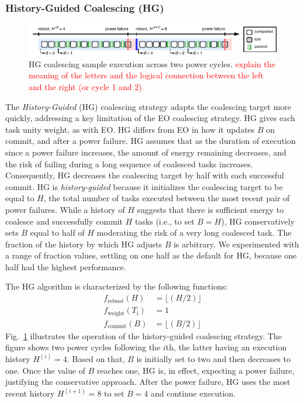 \subsubsection{History-Guided Coalescing (HG)}
\label{subsec:energyAware}
%
\begin{figure}
    \includegraphics[width=\linewidth]{figures/hg-coal-horiz.pdf}
    \caption{HG coalescing sample execution across two power cycles. \textcolor{red}{explain the meaning of the letters and the logical connection between the left and the right (or cycle 1 and 2)}}
    \label{fig:hg-coal}
\end{figure}
%
The \emph{History-Guided} (HG) coalescing strategy adapts the coalescing target more
quickly, addressing a key limitation of the EO coalescing strategy.  
HG gives each task unity weight, as with EO.  
HG differs from EO in how it updates $B$ on commit, and after a power failure.
HG assumes that as the duration of execution since a power failure increases,
the amount of energy remaining decreases, and the risk of failing during a long
sequence of coalesced tasks increases.  
Consequently, HG decreases the coalescing target by half with each successful commit.
HG is {\em history-guided} because it initializes the coalescing target to be
equal to $H$, the total number of tasks executed between the most recent pair
of power failures.
While a history of $H$ suggests that there is sufficient energy to coalesce and
successfully commit $H$ tasks (i.e., to set $B = H$), HG conservatively sets $B$ equal to half
of $H$ moderating the risk of a very long coalesced task. 
The fraction of the history by which HG adjusts $B$ is arbitrary.
We experimented with a range of fraction values, settling on one half as the
default for HG, because one half had the highest performance. 

The HG algorithm is characterized by the following functions: 
%
\begin{equation}
	\begin{split}
		 f_\text{reboot}(H) 			& = \lfloor(H / 2)\rfloor \\
		 f_\text{weight}(T_\text{i}) 	& =  1 \\
		 f_\text{commit}(B) 			& = \lfloor(B / 2)\rfloor
	\end{split}
\end{equation}
%
Fig.~\ref{fig:hg-coal} illustrates the operation of the history-guided
coalescing strategy.
The figure shows two power cycles following the $i$th, the latter having an
execution history $H^{(i)} = 4$.
Based on that, $B$ is initially set to two and then decreases to one. Once the
value of $B$ reaches one, HG is, in effect, expecting a power failure,
justifying the conservative approach. After the power failure, HG
uses the most recent history $H^{(i+1)} = 8$ to set $B = 4$
and continue execution.
%
